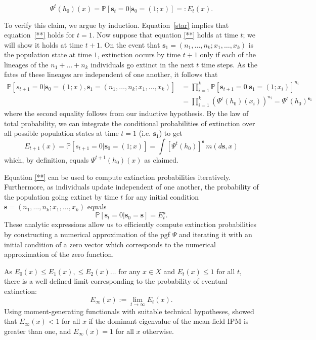 \documentclass[12pt]{amsart}\usepackage[]{graphicx}\usepackage[]{color}
\def\P{\mathbb P}
\def\s{\mathbf s}
\begin{document}
\begin{equation}\label{**}
\Psi^t(h_0)(x)=\P[\s_t=0|\s_0=(1;x)]=:E_t(x).
\end{equation}

To verify this claim, we argue by induction. Equation~\eqref{star} implies that equation~\eqref{**} holds for $t=1$. Now suppose that equation \eqref{**} holds at time $t$; we will show it holds at time $t+1$.  On the event that $\s_1=(n_1, \dots, n_k;x_1, \dots, x_k)$ is the population state at time $1$, extinction occurs by time $t+1$ only if each of the lineages of the $n_1+\dots +n_k$ individuals go extinct in the next $t$ time steps. As the fates of these lineages are independent of one another, it follows that
\[
\begin{aligned}
\P[s_{t+1}=0|\s_0=(1; x), \s_1=(n_1, \dots, n_k;x_1, \dots, x_k)]&= \prod_{i=1}^k \P[\s_{t+1}=0|\s_1=(1; x_i)]^{n_i}\\
&=\prod_{i=1}^k\left(\Psi^t(h_0)(x_i)\right)^{n_i}=\Psi^t(h_0)^{\s_1}
\end{aligned}
\]
where the second equality follows from our inductive hypothesis. By the law of total probability, we can integrate the conditional probabilities of extinction over all possible population states at time $t=1$ (i.e. $\s_1$) to get
\[
E_{t+1}(x)=\P[s_{t+1}=0|\s_0=(1;x)]=\int [\Psi^t(h_0)]^\s \, m(d\s, x)
\]
which, by definition, equals $\Psi^{t+1}(h_0)(x)$ as claimed.

Equation \eqref{**} can be used to compute extinction probabilities iteratively. Furthermore, as individuals update independent of one another, the probability of the population going extinct by time $t$ for any initial condition $\s=(n_1, \dots, n_k;x_1, \dots, x_k)$ equals
\begin{equation}\label{starstar}
\P[\s_t=0|\s_0=\s]=E_t^\s.
\end{equation}
These analytic expressions allow us to efficiently compute extinction probabilities by constructing a numerical approximation of the pgf $\Psi$ and iterating it with an initial condition of a zero vector which corresponds to the numerical approximation of the zero function.

As $E_0(x)\le E_1(x), \le E_2(x)\dots$ for any $x\in X$ and $E_t(x)\le 1$ for all $t$, there is a well defined limit corresponding to the probability of eventual extinction:
\[
E_\infty(x):=\lim_{t\to\infty} E_t(x).
\]
Using moment-generating functionals with suitable technical hypotheses, \citet{harris-63} showed that $E_\infty(x)<1$ for all $x$ if the dominant eigenvalue of the mean-field IPM is greater than one, and $E_\infty(x)=1$ for all $x$ otherwise.
\end{document}

